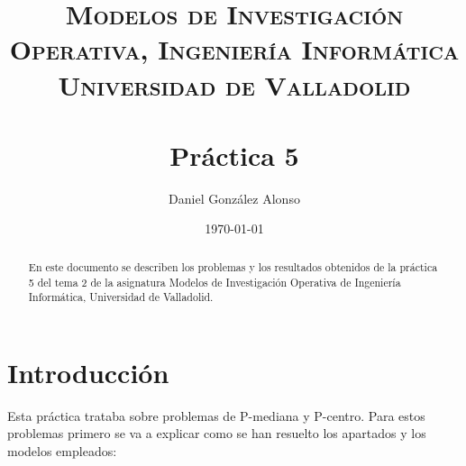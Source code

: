 \documentclass[a4paper,11pt]{article}
\title{
	\vspace{-25pt}
	\normalfont \Large \textsc{
		Modelos de Investigación Operativa,
        Ingeniería Informática\\
        Universidad de Valladolid
	}\\[10pt]
	\horrule{1pt}\\[10pt]
	\huge \textbf{
		Práctica 5
	}\\
	\horrule{1pt}
}
\author{
	\normalfont \Large Daniel González Alonso
}
\date{
	\normalfont \large \today
}
\begin{document}
\maketitle

\begin{abstract}
	En este documento se describen los problemas y los resultados obtenidos de la práctica 5 del tema 2 de la asignatura Modelos de Investigación Operativa de Ingeniería Informática, Universidad de Valladolid.
\end{abstract}

\section{Introducción}

Esta práctica trataba sobre problemas de P-mediana y P-centro. Para estos problemas primero se va a explicar como se han resuelto los apartados y los modelos empleados:
\end{document}
